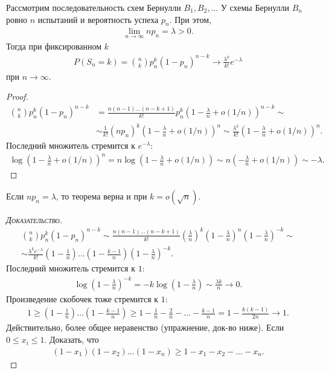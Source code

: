 \begin{thm}[%
 Пуассона]
 \label{theorem:poisson}
 Рассмотрим последовательность схем Бернулли $B_1, B_2, \ldots$ У схемы Бернулли $B_n$ ровно $n$ испытаний и вероятность успеха $p_n$. При этом,
 \begin{align*}
  \lim_{n \to \infty} np_n = \lambda > 0 
 .\end{align*} Тогда при фиксированном $k$
 \begin{align*}
  P(S_n = k) = \binom n k p_n^{k} (1-p_n)^{n-k} \to \frac{\lambda^{k}}{k!} e^{-\lambda}
 \end{align*} при $n \to \infty$.
\end{thm}
\begin{proof}
 \begin{align*}
  \binom n k p_n^{k}(1-p_n)^{n-k} &= \frac{n(n-1)\ldots(n-k+1)}{k!} p_n^{k} \left(1 - \frac{\lambda}{n} + o (1 / n)\right)^{n-k} \sim \\
  & \sim \frac{1}{k!}(np_n)^{k} \left( 1 - \frac{\lambda}{n} + o(1 / n) \right)^{n} \sim \frac{\lambda^{k}}{k!} \left( 1 - \frac{\lambda}{n} + o(1 / n) \right)^{n}
 .\end{align*}  Последний множитель стремится к $e^{-\lambda}$:
 \begin{align*}
  \log \left( 1 - \frac{\lambda}{n} + o(1 / n) \right)^{n} = n \log \left( 1 - \frac{\lambda}{n} + o(1 / n) \right) \sim n \left( - \frac{\lambda}{n} + o(1 / n) \right) \sim -\lambda
 .\end{align*} 
\end{proof}

\begin{remrk*}
 Если $np_n = \lambda$, то теорема верна и при $k = o(\sqrt{n})$.
\end{remrk*}
\begin{proof}[\normalfont\textsc{Доказательство}]
 \begin{align*}
  \binom n k p_n^{k} (1-p_n)^{n-k} \sim \frac{n(n-1)\ldots(n-k+1)}{k!} \left( \frac{\lambda}{n} \right)^{k}\left(1 - \frac{\lambda}{n}\right)^{n} \left( 1 - \frac{\lambda}{n} \right)^{-k} \sim \\
  \sim \frac{\lambda^{k}e^{-\lambda}}{k!} \left( 1 - \frac{1}{n} \right) \ldots \left(1 - \frac{k - 1}{n}\right) \left( 1 - \frac{\lambda}{n} \right)^{-k}
 .\end{align*} Последний множитель стремится к $1$:
 \begin{align*}
  \log \left( 1 - \frac{\lambda}{n} \right)^{-k} = -k \log \left( 1 - \frac{\lambda}{n} \right) \sim \frac{\lambda k}{n} \to 0
 .\end{align*} Произведение скобочек тоже стремится к $1$:
 \begin{align*}
  1 \geqslant \left( 1 - \frac{1}{n} \right) \ldots \left( 1 - \frac{k-1}{n} \right) \geqslant 1 - \frac{1}{n} - \frac{2}{n} - \ldots - \frac{k - 1}{n} = 1- \frac{k(k-1)}{2n} \to 1
 .\end{align*} Действительно, более общее неравенство (упражнение, док-во ниже). Если $0 \leqslant x_i \leqslant 1$. Доказать, что
 \begin{align*}
  (1 - x_1)(1 - x_2) \ldots (1-x_n) \geqslant 1 - x_1 - x_2 - \ldots - x_n
 .\end{align*} 
\end{proof}

